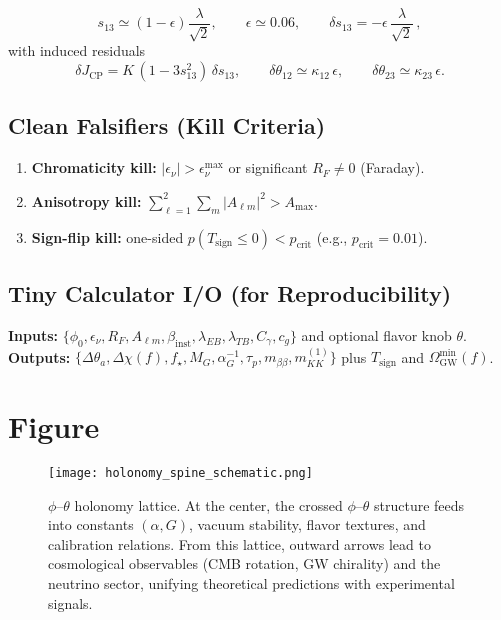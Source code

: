 \documentclass[11pt]{article}
\begin{document}
\begin{equation}
s_{13} \simeq (1-\epsilon)\frac{\lambda}{\sqrt{2}}, 
\qquad \epsilon \simeq 0.06,
\qquad 
\delta s_{13} = -\epsilon\, \frac{\lambda}{\sqrt{2}}\, ,
\end{equation}
with induced residuals
\begin{equation}
\delta J_{\mathrm{CP}} = K\, (1 - 3 s_{13}^2)\, \delta s_{13}, \qquad 
\delta \theta_{12} \simeq \kappa_{12}\,\epsilon, \qquad 
\delta \theta_{23} \simeq \kappa_{23}\,\epsilon.
\end{equation}

\subsection{Clean Falsifiers (Kill Criteria)}

\begin{enumerate}[leftmargin=2em,label=\textbf{(\arabic*)}]
    \item \textbf{Chromaticity kill:} $|\epsilon_\nu| > \epsilon_\nu^{\max}$ or significant $R_F\neq 0$ (Faraday).
    \item \textbf{Anisotropy kill:} $\sum_{\ell=1}^{2}\sum_m |A_{\ell m}|^2 > A_{\max}$.
    \item \textbf{Sign-flip kill:} one-sided $p(T_{\mathrm{sign}}\le 0) < p_{\mathrm{crit}}$ (e.g., $p_{\mathrm{crit}}=0.01$).
\end{enumerate}

\subsection{Tiny Calculator I/O (for Reproducibility)}

\noindent \textbf{Inputs:} $\{\phi_0,\epsilon_\nu,R_F,A_{\ell m},\beta_{\mathrm{inst}},\lambda_{EB},\lambda_{TB},C_\gamma,c_g\}$ and optional flavor knob $\theta$.\\
\textbf{Outputs:} $\{\Delta\theta_a,\Delta\chi(f),f_\star,M_G,\alpha_G^{-1},\tau_p,m_{\beta\beta},m^{(1)}_{KK}\}$ plus $T_{\mathrm{sign}}$ and $\Omega_{\mathrm{GW}}^{\min}(f)$.

\section{Figure}
\begin{figure}[h!]
    \centering
    \texttt{[image: holonomy\_spine\_schematic.png]}
    \caption{%
    $\phi$--$\theta$ holonomy lattice. At the center, the crossed $\phi$--$\theta$ structure feeds into constants $(\alpha,G)$, vacuum stability, flavor textures, and calibration relations. From this lattice, outward arrows lead to cosmological observables (CMB rotation, GW chirality) and the neutrino sector, unifying theoretical predictions with experimental signals.}
    \label{fig:holonomy}
\end{figure}
\end{document}
